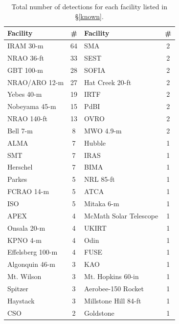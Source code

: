 \begin{table}[htb!]
\centering
\caption{Total number of detections for each facility listed in \S\ref{known}.}
\begin{tabular*}{\columnwidth}{l @{\extracolsep{\fill}}  c @{\extracolsep{\fill}}  l @{\extracolsep{\fill}}  c }
\hline\hline
Facility	&	\# 	&	Facility	&	\# \\
\hline
IRAM 30-m	&	64	&	SMA	&	2	\\
NRAO 36-ft	&	33	&	SEST	&	2	\\
GBT 100-m	&	28	&	SOFIA	&	2	\\
NRAO/ARO 12-m	&	27	&	Hat Creek 20-ft	&	2	\\
Yebes 40-m	&	19	&	IRTF	&	2	\\
Nobeyama 45-m	&	15	&	PdBI	&	2	\\
NRAO 140-ft	&	13	&	OVRO	&	2	\\
Bell 7-m	&	8	&	MWO 4.9-m	&	2	\\
ALMA	&	7	&	Hubble	&	1	\\
SMT	&	7	&	IRAS	&	1	\\
Herschel	&	7	&	BIMA	&	1	\\
Parkes	&	5	&	NRL 85-ft	&	1	\\
FCRAO 14-m	&	5	&	ATCA	&	1	\\
ISO	&	5	&	Mitaka 6-m	&	1	\\
APEX	&	4	&	McMath Solar Telescope	&	1	\\
Onsala 20-m	&	4	&	UKIRT	&	1	\\
KPNO 4-m	&	4	&	Odin	&	1	\\
Effelsberg 100-m	&	4	&	FUSE	&	1	\\
Algonquin 46-m	&	3	&	KAO	&	1	\\
Mt. Wilson	&	3	&	Mt. Hopkins 60-in	&	1	\\
Spitzer	&	3	&	Aerobee-150 Rocket	&	1	\\
Haystack	&	3	&	Millstone Hill 84-ft	&	1	\\
CSO	&	2	&	Goldstone	&	1	\\
\hline
\end{tabular*}
\label{detects_by_scope}
\end{table}\endinput